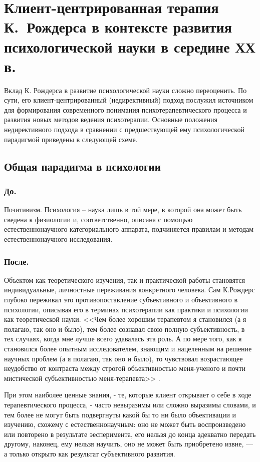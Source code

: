 \documentclass{../../common/thesisbyxetex}
\begin{document}
\tableofcontents 	%
\clearpage


\section{Клиент-центрированная терапия К.~Рождерса в контексте развития психологической науки в 
середине ХХ в.}
Вклад К. Рождерса в развитие психологической науки сложно переоценить. По сути, его 
клиент-центрированный (недирективный) подход послужил источником для формирования  современного 
понимания психотерапевтического процесса и развития новых методов ведения психотерапии.
Основные положения недирективного подхода в сравнении с предшествующей ему психологической 
парадигмой приведены в следующей схеме.

 \subsection*{Общая парадигма в психологии}
 
 \subsubsection*{До.} Позитивизм. Психология – наука лишь в той мере, в которой она может быть 
сведена к физиологии и, соответственно, описана с помощью естественнонаучного категориального 
аппарата, подчиняется правилам и методам естественнонаучного исследования.

\subsubsection*{После.} Объектом как теоретического изучения, так и практической работы становятся 
индивидуальные, личностные переживания конкретного человека.  Сам К.Рождерс глубоко переживал это 
противопоставление субъективного и объективного в психологии, описывая его в терминах психотерапии 
как практики и психологии как теоретической науки. <<Чем более хорошим терапевтом я становился (а я 
полагаю, так оно и было), тем более сознавал свою полную субъективность, в тех случаях, когда мне 
лучше всего удавалась эта роль. А по мере того, как я становился более опытным исследователем, 
знающим и нацеленным на решение научных проблем (а я полагаю, так оно и было), то чувствовал 
возрастающее неудобство от контраста между строгой объективностью меня-ученого и почти мистической 
субъективностью меня-терапевта>> \cite{rogersbec}. 

При этом наиболее ценные знания, - те, которые  клиент открывает о себе в ходе терапевтического 
процесса, - часто невыразимы или сложно выразимы словами, и тем более не могут быть подвергнуты 
какой бы то ни было объективации и изучению, схожему с естественнонаучным: оно не может быть 
воспроизведено или повторено в результате эесперимента, его нельзя до конца адекватно передать 
другому, наконец, ему нельзя научить, оно не может быть приобретено извне, --- а только открыто как 
результат субъективного развития.
\end{document}
